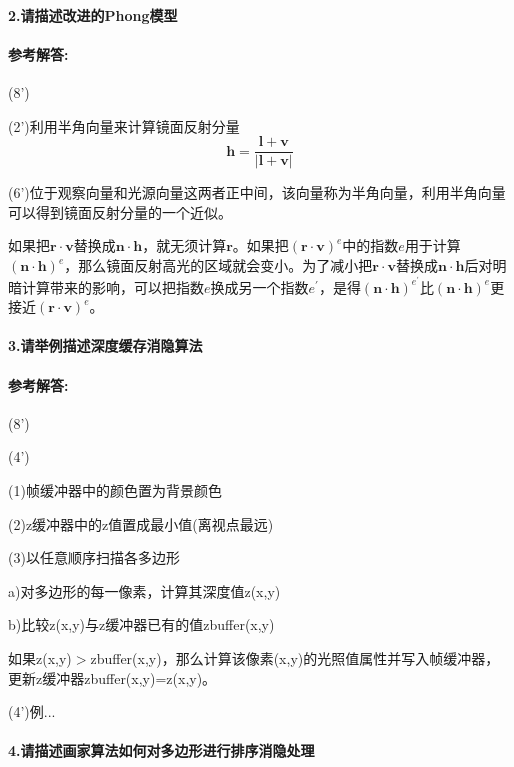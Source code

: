 \documentclass[12pt,a4paper,UTF8]{ctexart}
\begin{document}
	\paragraph{2.请描述改进的Phong模型}
	\paragraph{参考解答:}(8')
	\par (2')利用半角向量来计算镜面反射分量
	\[\boldsymbol h=\frac{\boldsymbol l+\boldsymbol v}{\left |\boldsymbol l+\boldsymbol v \right |}\]
	\par (6')位于观察向量和光源向量这两者正中间，该向量称为半角向量，利用半角向量可以得到镜面反射分量的一个近似。
	\par 如果把$\boldsymbol r\cdot\boldsymbol v$替换成$\boldsymbol n\cdot\boldsymbol h$，就无须计算$\boldsymbol r$。如果把$(\boldsymbol r\cdot\boldsymbol v)^{e}$中的指数$e$用于计算$(\boldsymbol n\cdot\boldsymbol h)^{e}$，那么镜面反射高光的区域就会变小。为了减小把$\boldsymbol r\cdot\boldsymbol v$替换成$\boldsymbol n\cdot\boldsymbol h$后对明暗计算带来的影响，可以把指数$e$换成另一个指数$e^{'}$，是得$(\boldsymbol n\cdot\boldsymbol h)^{e^{'}}$比$(\boldsymbol n\cdot\boldsymbol h)^{e}$更接近$(\boldsymbol r\cdot\boldsymbol v)^{e}$。
	\paragraph{3.请举例描述深度缓存消隐算法}
	\paragraph{参考解答:}(8')
	\par (4')
	\par (1)帧缓冲器中的颜色置为背景颜色
	\par (2)z缓冲器中的z值置成最小值(离视点最远)
	\par (3)以任意顺序扫描各多边形
	\par a)对多边形的每一像素，计算其深度值z(x,y)
	\par b)比较z(x,y)与z缓冲器已有的值zbuffer(x,y)
	\par 如果z(x,y)$>$zbuffer(x,y)，那么计算该像素(x,y)的光照值属性并写入帧缓冲器，更新z缓冲器zbuffer(x,y)=z(x,y)。
	\par (4')例...
	\newpage
	\paragraph{4.请描述画家算法如何对多边形进行排序消隐处理}
\end{document}
